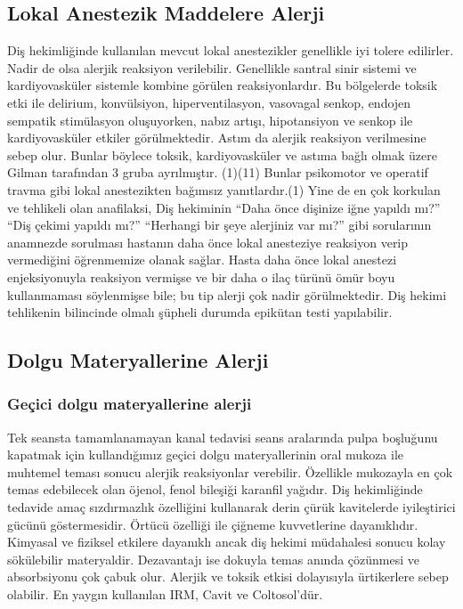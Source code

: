 \subsection{Lokal Anestezik Maddelere Alerji}
Diş hekimliğinde kullanılan mevcut lokal anestezikler genellikle iyi tolere edilirler. Nadir de olsa alerjik reaksiyon verilebilir. 
Genellikle santral sinir sistemi ve kardiyovasküler sistemle kombine görülen reaksiyonlardır. Bu bölgelerde toksik etki ile delirium, konvülsiyon, hiperventilasyon, vasovagal senkop, endojen sempatik stimülasyon oluşuyorken, nabız artışı, hipotansiyon ve senkop ile kardiyovasküler etkiler görülmektedir. Astım da alerjik reaksiyon verilmesine sebep olur. Bunlar böylece toksik, kardiyovasküler ve astıma bağlı olmak üzere Gilman tarafından 3 gruba ayrılmıştır. (1)(11) Bunlar psikomotor ve operatif travma gibi lokal anestezikten bağımsız yanıtlardır.(1)  Yine de en çok korkulan ve tehlikeli olan anafilaksi, %
Diş hekiminin  “Daha önce dişinize iğne yapıldı mı?” “Diş çekimi yapıldı mı?” “Herhangi bir şeye alerjiniz var mı?” gibi sorularının anamnezde sorulması hastanın daha önce lokal anesteziye reaksiyon verip vermediğini öğrenmemize olanak sağlar. Hasta daha önce lokal anestezi enjeksiyonuyla reaksiyon vermişse ve bir daha o ilaç türünü ömür boyu kullanmaması söylenmişse bile; bu tip alerji çok nadir görülmektedir. Diş hekimi tehlikenin bilincinde olmalı şüpheli durumda epikütan testi yapılabilir. 


\subsection{Dolgu Materyallerine Alerji}
\subsubsection{Geçici dolgu materyallerine alerji}
Tek seansta tamamlanamayan kanal tedavisi seans aralarında pulpa boşluğunu kapatmak için kullandığımız geçici dolgu materyallerinin oral mukoza ile muhtemel teması sonucu alerjik reaksiyonlar verebilir. 
Özellikle mukozayla en çok temas edebilecek olan  öjenol, fenol bileşiği karanfil yağıdır. Diş hekimliğinde tedavide amaç sızdırmazlık özelliğini kullanarak derin çürük kavitelerde iyileştirici gücünü göstermesidir.  Örtücü özelliği ile çiğneme kuvvetlerine dayanıklıdır. Kimyasal ve fiziksel etkilere dayanıklı ancak diş hekimi müdahalesi sonucu kolay sökülebilir materyaldir. Dezavantajı ise dokuyla temas anında çözünmesi ve absorbsiyonu çok çabuk olur. Alerjik ve toksik etkisi dolayısıyla ürtikerlere sebep olabilir. En yaygın kullanılan IRM, Cavit ve Coltosol’dür.




